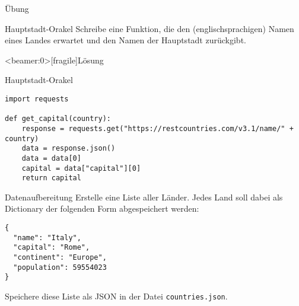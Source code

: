 \begin{frame}{Übung}

\begin{block}{Hauptstadt-Orakel}
\vspace{2pt}
Schreibe eine Funktion, die den (englischsprachigen) Namen eines Landes erwartet und den Namen der Hauptstadt zurückgibt.
\end{block}
\end{frame}





\begin{frame}<beamer:0>[fragile]{Lösung}
\begin{solutionblock}{Hauptstadt-Orakel}
\begin{verbatim}
import requests

def get_capital(country): 
    response = requests.get("https://restcountries.com/v3.1/name/" + country)
    data = response.json()
    data = data[0]
    capital = data["capital"][0]
    return capital
\end{verbatim}
\end{solutionblock}
\end{frame}








\begin{fragile}[Übung]
\begin{block}{Datenaufbereitung}
\vspace{2pt}
Erstelle eine Liste aller Länder. Jedes Land soll dabei als Dictionary der folgenden Form abgespeichert werden: 
\begin{verbatim}
{
  "name": "Italy",
  "capital": "Rome",
  "continent": "Europe", 
  "population": 59554023
}
\end{verbatim} 
Speichere diese Liste als JSON in der Datei \texttt{countries.json}. 
\end{block}
\end{fragile}

